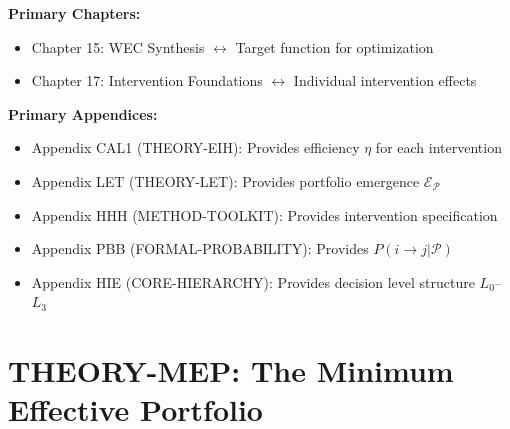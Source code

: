 \begin{tcolorbox}[colback=purple!5!white, colframe=purple!75!black,
    title=Chapter Linkage]

\textbf{Primary Chapters:}
\begin{itemize}[nosep]
\item Chapter 15: WEC Synthesis $\leftrightarrow$ Target function for optimization
\item Chapter 17: Intervention Foundations $\leftrightarrow$ Individual intervention effects
\end{itemize}

\textbf{Primary Appendices:}
\begin{itemize}[nosep]
\item Appendix CAL1 (THEORY-EIH): Provides efficiency $\eta$ for each intervention
\item Appendix LET (THEORY-LET): Provides portfolio emergence $\mathcal{E}_{\mathcal{P}}$
\item Appendix HHH (METHOD-TOOLKIT): Provides intervention specification
\item Appendix PBB (FORMAL-PROBABILITY): Provides $P(i \to j | \mathcal{P})$
\item Appendix HIE (CORE-HIERARCHY): Provides decision level structure $L_0$--$L_3$
\end{itemize}

\end{tcolorbox}


\chapter{THEORY-MEP: The Minimum Effective Portfolio}
\label{app:theory-mep}


\begin{abstract}
How many interventions at which decision levels are needed to change behavior?
This appendix answers this question by formalizing the \textbf{Minimum Effective
Portfolio (MEP)} problem---the behavioral analogue to Markowitz's Minimum Variance
Portfolio in finance. We prove that optimal intervention portfolios minimize cost
subject to a minimum effectiveness constraint, where effectiveness depends on
individual intervention effects, their efficiency (EIH), and portfolio emergence
(LET). The key insight: while financial portfolios benefit from low covariance
(diversification), behavioral portfolios benefit from high complementarity
(synergy). We derive the Behavioral Efficient Frontier and provide analytical
solutions for special cases.
\end{abstract}

